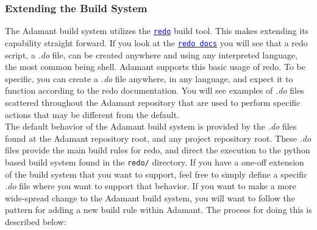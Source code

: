 \subsubsection{Extending the Build System} \label{Extending the Build System}

The Adamant build system utilizes the \href{https://redo.readthedocs.io/en/latest/}{\texttt{\textcolor{blue}{redo}}} build tool. This makes extending its capability straight forward. If you look at the \href{https://redo.readthedocs.io/en/latest/}{\texttt{\textcolor{blue}{redo docs}}} you will see that a redo script, a \textit{.do} file, can be created anywhere and using any interpreted language, the most common being shell. Adamant supports this basic usage of redo. To be specific, you can create a \textit{.do} file anywhere, in any language, and expect it to function according to the redo documentation. You will see examples of \textit{.do} files scattered throughout the Adamant repository that are used to perform specific actions that may be different from the default. \\

The default behavior of the Adamant build system is provided by the \textit{.do} files found at the Adamant repository root, and any project repository root. These \textit{.do} files provide the main build rules for redo, and direct the execution to the python based build system found in the \texttt{redo/} directory. If you have a one-off extension of the build system that you want to support, feel free to simply define a specific \textit{.do} file where you want to support that behavior. If you want to make a more wide-spread change to the Adamant build system, you will want to follow the pattern for adding a new build rule within Adamant. The process for doing this is described below:

